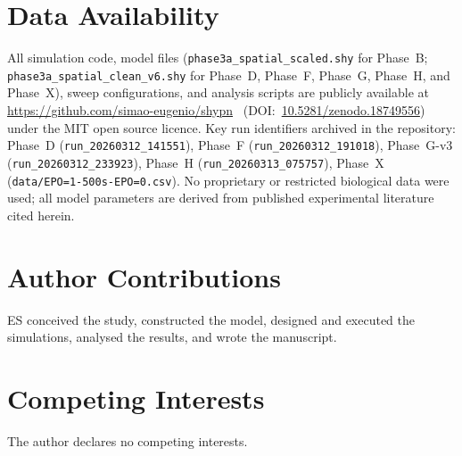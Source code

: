 \documentclass[10pt,letterpaper]{article}
\begin{document}
\section*{Data Availability}

All simulation code, model files (\texttt{phase3a\_spatial\_scaled.shy} for Phase~B; \texttt{phase3a\_spatial\_clean\_v6.shy} for Phase~D, Phase~F, Phase~G, Phase~H, and Phase~X), sweep configurations, and analysis scripts are publicly available at \url{https://github.com/simao-eugenio/shypn}~\cite{shypn2026} (DOI:~\href{https://doi.org/10.5281/zenodo.18749556}{10.5281/zenodo.18749556}) under the MIT open source licence. Key run identifiers archived in the repository: Phase~D (\texttt{run\_20260312\_141551}), Phase~F (\texttt{run\_20260312\_191018}), Phase~G-v3 (\texttt{run\_20260312\_233923}), Phase~H (\texttt{run\_20260313\_075757}), Phase~X (\texttt{data/EPO=1-500s-EPO=0.csv}). No proprietary or restricted biological data were used; all model parameters are derived from published experimental literature cited herein.

\section*{Author Contributions}

ES conceived the study, constructed the model, designed and executed the simulations, analysed the results, and wrote the manuscript.

\section*{Competing Interests}

The author declares no competing interests.



\end{document}
